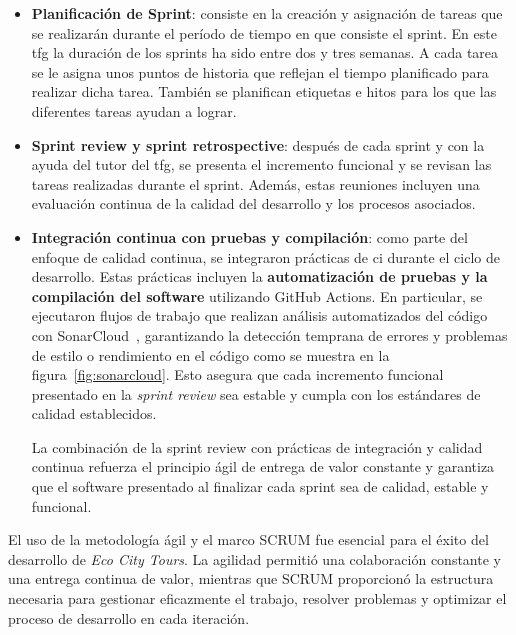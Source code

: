 \begin{itemize}
	\item \textbf{Planificación de Sprint}: consiste en la creación y asignación de tareas que se realizarán durante el período de tiempo en que consiste el sprint. En este \acrshort{tfg} la duración de los sprints ha sido entre dos y tres semanas. A cada tarea se le asigna unos puntos de historia que reflejan el tiempo planificado para realizar dicha tarea. También se planifican etiquetas e hitos para los que las diferentes tareas ayudan a lograr.
	\item \textbf{Sprint review y sprint retrospective}: después de cada sprint y con la ayuda del tutor del \acrshort{tfg}, se presenta el incremento funcional y se revisan las tareas realizadas durante el sprint. Además, estas reuniones incluyen una evaluación continua de la calidad del desarrollo y los procesos asociados.
	\item \textbf{Integración continua con pruebas y compilación}: como parte del enfoque de calidad continua, se integraron prácticas de \acrfull{ci} durante el ciclo de desarrollo. Estas prácticas incluyen la \textbf{automatización de pruebas y la compilación del software} utilizando GitHub Actions. En particular, se ejecutaron flujos de trabajo que realizan análisis automatizados del código con SonarCloud~\cite{sonarcloud}, garantizando la detección temprana de errores y problemas de estilo o rendimiento en el código como se muestra en la figura~\ref{fig:sonarcloud}. Esto asegura que cada incremento funcional presentado en la \textit{sprint review} sea estable y cumpla con los estándares de calidad establecidos.
	
	La combinación de la sprint review con prácticas de integración y calidad continua refuerza el principio ágil de entrega de valor constante y garantiza que el software presentado al finalizar cada sprint sea de calidad, estable y funcional.
	\end{itemize}

El uso de la metodología ágil y el marco SCRUM fue esencial para el éxito del desarrollo de \textit{Eco City Tours}. La agilidad permitió una colaboración constante y una entrega continua de valor, mientras que SCRUM proporcionó la estructura necesaria para gestionar eficazmente el trabajo, resolver problemas y optimizar el proceso de desarrollo en cada iteración.
